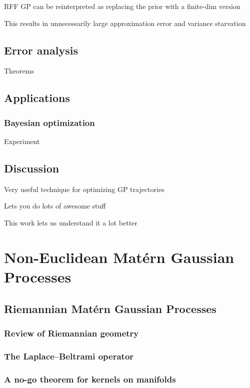 \documentclass[11pt]{book}
\begin{document}
RFF GP can be reinterpreted as replacing the prior with a finite-dim version

This results in unnecessarily large approximation error and variance starvation

\section{Error analysis}

Theorems

\section{Applications}

\subsection{Bayesian optimization}

Experiment

\section{Discussion}

Very useful technique for optimizing GP trajectories

Lets you do lots of awesome stuff

This work lets us understand it a lot better





\chapter{Non-Euclidean Matérn Gaussian Processes}

\section{Riemannian Matérn Gaussian Processes}

\subsection{Review of Riemannian geometry}
\subsection{The Laplace--Beltrami operator}
\subsection{A no-go theorem for kernels on manifolds}
\end{document}
